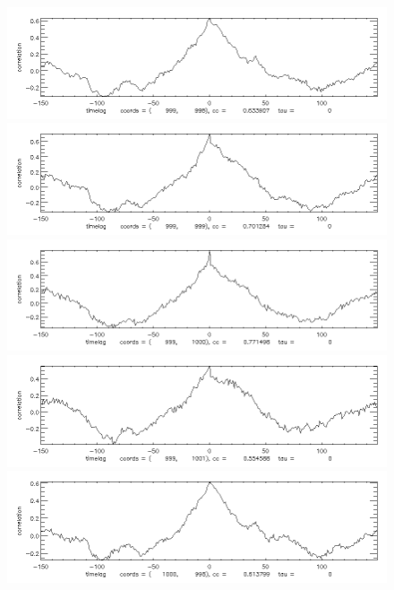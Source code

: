 \documentclass[12pt]{article}
\begin{document}
\begin{figure}[here]
\newpage
\includegraphics[width=7in]{cc11.png}
\includegraphics[width=7in]{cc12.png}
\includegraphics[width=7in]{cc13.png}
\includegraphics[width=7in]{cc14.png}
\includegraphics[width=7in]{cc15.png}
\end{figure}
\newpage
\end{document}
